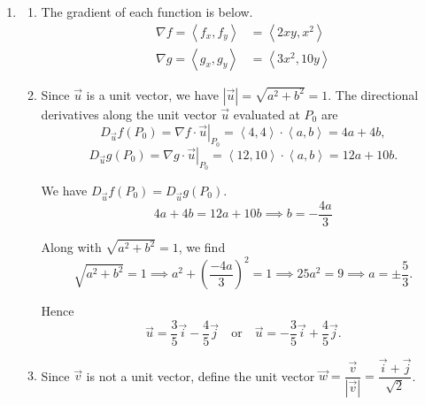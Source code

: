 \documentclass[a4paper, 12pt]{article}
\begin{document}
\begin{enumerate}[leftmargin=*,label=\textbf{\arabic*.}]
\begin{enumerate}[leftmargin=*,label=\textbf{\alph*.}]
The parametric equations for a line that passes through the point $P_0(x_0,y_0,z_0)$ is given by
\[\left.\begin{array}{c}
x=r_1+r_1't\\
y=r_2+r_2't\\
z=r_3+r_3't
\end{array}\right\}\quad t\in\mathbb{R}.\]

Therefore, the parametric equations for the line $L$ is
\[\boxed{\left.\begin{array}{l}
x=2+t\\
y=4+4t\\
z=8+12t
\end{array}\right\}\quad t\in\mathbb{R}}.\]

\end{enumerate}

\item \begin{enumerate}[leftmargin=*,label=\textbf{\alph*.}]
\item The gradient of each function is below.
\[\boxed{\begin{aligned}
\nabla f=\left\langle f_x, f_y\right\rangle&=\left\langle2xy, x^2\right\rangle\\
\nabla g=\left\langle g_x, g_y\right\rangle&=\left\langle3x^2, 10y\right\rangle
\end{aligned}}
\]

\item Since $\vec u$ is a unit vector, we have $|\vec u|=\sqrt{a^2+b^2}=1$. The directional derivatives along the unit vector $\vec u$ evaluated at $P_0$ are
\[D_{\vec u}f(P_0)=\nabla f\cdot\left.\vec u\right|_{P_0}=\left\langle4,4\right\rangle\cdot\left\langle a,b\right\rangle=4a+4b,\]
\[D_{\vec u}g(P_0)=\nabla g\cdot\left.\vec u\right|_{P_0}=\left\langle12,10\right\rangle\cdot\left\langle a,b\right\rangle=12a+10b.\]

We have $D_{\vec u}f(P_0)=D_{\vec u}g(P_0)$.
\[4a+4b=12a+10b\implies b=-\frac{4a}{3}\]

Along with $\sqrt{a^2+b^2}=1$, we find
\[\sqrt{a^2+b^2}=1\implies a^2+\left(\frac{-4a}3\right)^2=1\implies25a^2=9\implies a=\pm\frac{5}{3}.\]

Hence
\[\boxed{\vec u=\frac35\vec i-\frac45\vec j\quad \text{or}\quad\vec u=-\frac35\vec i+\frac45\vec j}.\]

\item Since $\vec v$ is not a unit vector, define the unit vector $\vec w=\dfrac{\vec v}{\left|\vec v\right|}=\dfrac{\vec i+\vec j}{\sqrt2}$.


\end{enumerate}
\end{enumerate}
\end{document}
